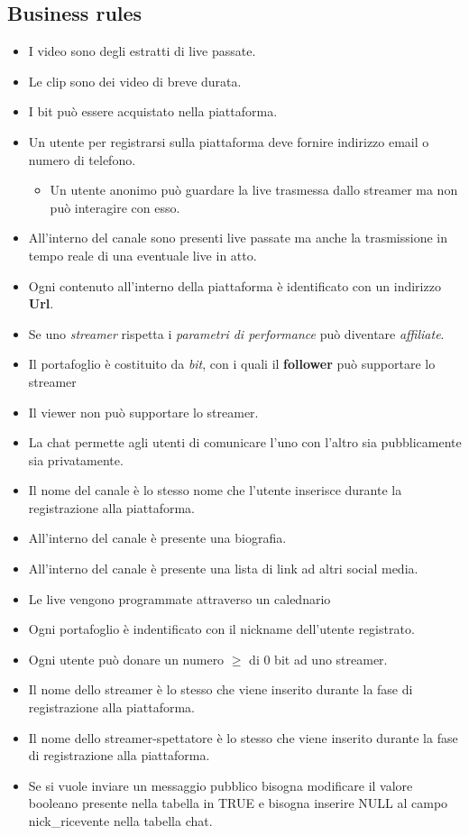\subsection{Business rules}
\begin{itemize}
    \item I video sono degli estratti di live passate.
    \item Le clip sono dei video di breve durata.
    \item I bit può essere acquistato nella piattaforma.
    \item Un utente per registrarsi sulla piattaforma deve fornire indirizzo email o numero di telefono.
    \begin{itemize}
        \item Un utente anonimo può guardare la live trasmessa dallo streamer ma non può interagire con esso. 
    \end{itemize}
    \item All'interno del canale sono presenti live passate ma anche la trasmissione in tempo reale di una eventuale live in atto.
    \item Ogni contenuto all'interno della piattaforma è identificato con un indirizzo \textbf{Url}.
        \item Se uno \textit{streamer} rispetta i \textit{parametri di performance} può diventare \textit{affiliate}.
        \item Il portafoglio è costituito da \textit{bit}, con i quali il \textbf{follower} può supportare lo streamer
        \item Il viewer non può supportare lo streamer.
        \item La chat permette agli utenti di comunicare l'uno con l'altro sia pubblicamente sia privatamente.
        \item Il nome del canale è lo stesso nome che l'utente inserisce durante la registrazione alla piattaforma.
        \item All'interno del canale è presente una biografia. 
        \item All'interno del canale è presente una lista di link ad altri social media.
        \item Le live vengono programmate attraverso un calednario
        \item Ogni portafoglio è indentificato con il nickname dell'utente registrato. 
        \item Ogni utente può donare un numero $\geq$  di 0 bit ad uno streamer. 
        \item Il nome dello streamer è lo stesso che viene inserito durante la fase di registrazione alla piattaforma.
        \item Il nome dello streamer-spettatore è lo stesso che viene inserito durante la fase di registrazione alla piattaforma.
        \item Se si vuole inviare un messaggio pubblico bisogna modificare il valore booleano presente nella tabella in TRUE e bisogna inserire NULL al campo nick\_ricevente nella tabella chat.
\end{itemize}